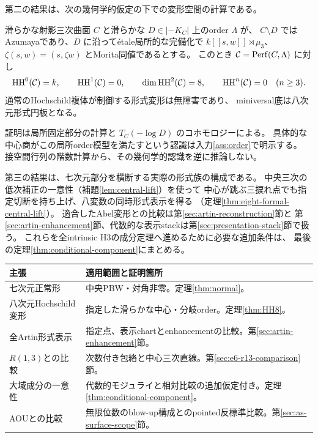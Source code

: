 \documentclass[11pt,a4paper]{ltjsarticle}
\begin{document}
第二の結果は、次の幾何学的仮定の下での変形空間の計算である。
\begin{theorem}
滑らかな射影三次曲面 $C$ と滑らかな $D\in|-K_C|$ 上のorder $\Lambda$ が、
$C\setminus D$ ではAzumayaであり、$D$ に沿って\'etale局所的な完備化で
$k[[s,w]]\rtimes\mu_3$、$\zeta(s,w)=(s,\zeta w)$ とMorita同値であるとする。
このとき $\mathcal C=\operatorname{Perf}(C,\Lambda)$ に対し
\[
 \operatorname{HH}^0(\mathcal C)=k,\qquad \operatorname{HH}^1(\mathcal C)=0,\qquad
 \dim\operatorname{HH}^2(\mathcal C)=8,\qquad \operatorname{HH}^n(\mathcal C)=0\quad(n\ge3).
\]
通常のHochschild複体が制御する形式変形は無障害であり、
miniversal底は八次元形式円板となる。
\end{theorem}
証明は局所固定部分の計算と $T_C(-\log D)$ のコホモロジーによる。
具体的な中心商がこの局所order模型を満たすという認識は入力\ref{ass:order}で明示する。
接空間行列の階数計算から、その幾何学的認識を逆に推論しない。

第三の結果は、七次元部分を横断する実際の形式族の構成である。
中央三次の低次補正の一意性（補題\ref{lem:central-lift}）を使って
中心が跳ぶ三捩れ点でも指定切断を持ち上げ、八変数の同時形式表示を得る
（定理\ref{thm:eight-formal-central-lift}）。
適合したAbel変形との比較は第\ref{sec:artin-reconstruction}節と
第\ref{sec:artin-enhancement}節、代数的な表示stackは第\ref{sec:presentation-stack}節で扱う。
これらを全intrinsic H3の成分定理へ進めるために必要な追加条件は、
最後の定理\ref{thm:conditional-component}にまとめる。

\begin{center}
\begin{tabular}{p{}p{}}
\toprule
主張 & 適用範囲と証明箇所\\\midrule
七次元正常形 & 中央PBW・対角非零。定理\ref{thm:normal}。\\
八次元Hochschild変形 & 指定した滑らかな中心・分岐order。定理\ref{thm:HH8}。\\
全Artin形式表示 & 指定点、表示chartとenhancementの比較。第\ref{sec:artin-enhancement}節。\\
$R(1,3)$との比較 & 次数付き包絡と中心三次直線。第\ref{sec:e6-r13-comparison}節。\\
大域成分の一意性 & 代数的モジュライと相対比較の追加仮定付き。定理\ref{thm:conditional-component}。\\
AOUとの比較 & 無限位数のblow-up構成とのpointed反標準比較。第\ref{sec:as-surface-scope}節。\\
\bottomrule
\end{tabular}
\end{center}
\end{document}
